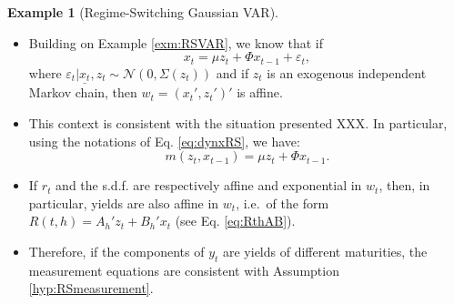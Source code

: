 \documentclass[
  12pt,
]{book}
\providecommand{\tightlist}{%
  \setlength{\itemsep}{0pt}\setlength{\parskip}{0pt}}
\theoremstyle{definition}
\theoremstyle{definition}
\newtheorem{example}{Example}[chapter]
\theoremstyle{definition}
\theoremstyle{definition}
\theoremstyle{remark}
\begin{document}
\begin{example}[Regime-Switching Gaussian VAR]
\protect\hypertarget{exm:GRSVAR}{}\label{exm:GRSVAR}\leavevmode

\begin{itemize}
\tightlist
\item
  Building on Example \ref{exm:RSVAR}, we know that if
  \begin{equation}
  x_t = \mu z_t + \Phi x_{t-1} +  \varepsilon_t,\label{eq:xRSVAR}
  \end{equation}
  where \(\varepsilon_t|\underline{x_t},z_t \sim \mathcal{N}(0,\Sigma(z_t))\) and if \(z_t\) is an exogenous independent Markov chain, then \(w_t = (x_t',z_t')'\) is affine.
\item
  This context is consistent with the situation presented XXX. In particular, using the notations of Eq. \eqref{eq:dynxRS}, we have:
  \[
  m(z_t,x_{t-1}) = \mu z_t + \Phi x_{t-1}.
  \]
\item
  If \(r_t\) and the s.d.f. are respectively affine and exponential in \(w_t\), then, in particular, yields are also affine in \(w_t\), i.e.~of the form \(R(t,h)= A_h'z_t + B_{h}'x_t\) (see Eq. \eqref{eq:RthAB}).
\item
  Therefore, if the components of \(y_t\) are yields of different maturities, the measurement equations are consistent with Assumption \ref{hyp:RSmeasurement}.
\end{itemize}

\end{example}
\end{document}

